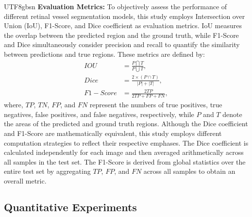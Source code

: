\documentclass[times, review, 10pt]{elsarticle}
\begin{document}
\begin{CJK}{UTF8}{gbsn}
\textbf{Evaluation Metrics:} To objectively assess the performance of different retinal vessel segmentation models, this study employs Intersection over Union (IoU), F1-Score, and Dice coefficient as evaluation metrics. IoU measures the overlap between the predicted region and the ground truth, while F1-Score and Dice simultaneously consider precision and recall to quantify the similarity between predictions and true regions. These metrics are defined by:
\begin{equation}
\begin{split}
IOU&=\frac{P\bigcap T}{P\bigcup T}, \\
Dice&=\frac{2\times(P\cap T)}{|P|+|T|},\\
F1-Score&=\frac{2TP}{2TP+FP+FN},
\end{split}
\end{equation}
where, $TP$, $TN$, $FP$, and $FN$ represent the numbers of true positives, true negatives, false positives, and false negatives, respectively, while $P$ and $T$ denote the areas of the predicted and ground truth regions. Although the Dice coefficient and F1-Score are mathematically equivalent, this study employs different computation strategies to reflect their respective emphases. The Dice coefficient is calculated independently for each image and then averaged arithmetically across all samples in the test set. The F1-Score is derived from global statistics over the entire test set by aggregating $TP$, $FP$, and $FN$ across all samples to obtain an overall metric.

\subsection{Quantitative Experiments}





\end{CJK}
\end{document}

